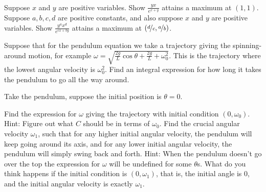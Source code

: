 \begin{exercise}
{\ }
\begin{tasks}
\task Suppose $x$ and $y$ are
positive variables.  Show $\frac{y x}{e^{x+y}}$
attains a maximum at $(1,1)$.\\
\task Suppose $a,b,c,d$ are positive constants, and also suppose $x$ and $y$ are
positive variables.  Show $\frac{y^a x^d}{e^{cx+by}}$
attains a maximum at $(\nicefrac{d}{c},\nicefrac{a}{b})$.
\end{tasks}
\end{exercise}

\begin{exercise}
Suppose that for the pendulum equation we take a trajectory giving the
spinning-around motion, for example $\omega = \sqrt{\frac{2g}{L} \cos \theta
+ \frac{2g}{L} + \omega_0^2}$.  This is the trajectory where the lowest
angular velocity is $\omega_0^2$.  Find an integral expression for how long it takes
the pendulum to go all the way around.
\end{exercise}


\begin{exercise}[challenging]
Take the pendulum, suppose the initial position is $\theta = 0$.
\begin{tasks}
\task
Find the expression for $\omega$ giving the trajectory
with initial condition $(0,\omega_0)$.  Hint: Figure out what $C$
should be in terms of $\omega_0$.
\task
Find the crucial angular velocity $\omega_1$, such that
for any higher initial angular velocity,
the pendulum will keep going around its
axis, and for any lower initial angular velocity, the pendulum will simply
swing back and forth.
Hint: When the pendulum doesn't go over the top the expression for $\omega$
will be undefined for some $\theta$s.
\task
What do you think happens if the initial condition is $(0,\omega_1)$,
that is, the initial angle is 0, and the initial angular velocity is exactly
$\omega_1$.
\end{tasks}
\end{exercise}

\setcounter{exercise}{100}

